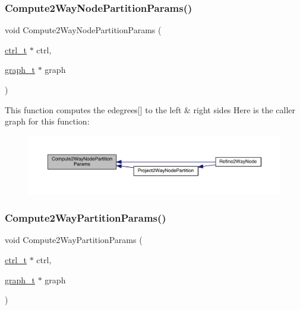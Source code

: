 \subsubsection{\texorpdfstring{Compute2\+Way\+Node\+Partition\+Params()}{Compute2WayNodePartitionParams()}}
{\footnotesize\ttfamily void Compute2\+Way\+Node\+Partition\+Params (\begin{DoxyParamCaption}\item[{\hyperlink{a00742}{ctrl\+\_\+t} $\ast$}]{ctrl,  }\item[{\hyperlink{a00734}{graph\+\_\+t} $\ast$}]{graph }\end{DoxyParamCaption})}

This function computes the edegrees\mbox{[}\mbox{]} to the left \& right sides Here is the caller graph for this function\+:\nopagebreak
\begin{figure}[H]
\begin{center}
\leavevmode
\includegraphics[width=350pt]{a00945_a66257f7c528ad75c86244ef3794d1ae5_icgraph}
\end{center}
\end{figure}
\mbox{\label{a00945_a0ed9efb4761e829a24f4066856640f86}} 
\subsubsection{\texorpdfstring{Compute2\+Way\+Partition\+Params()}{Compute2WayPartitionParams()}}
{\footnotesize\ttfamily void Compute2\+Way\+Partition\+Params (\begin{DoxyParamCaption}\item[{\hyperlink{a00742}{ctrl\+\_\+t} $\ast$}]{ctrl,  }\item[{\hyperlink{a00734}{graph\+\_\+t} $\ast$}]{graph }\end{DoxyParamCaption})}

